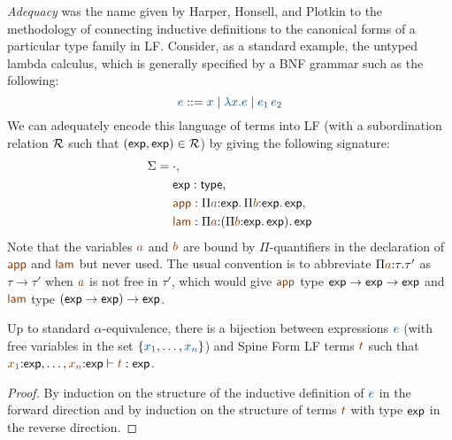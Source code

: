 {\it Adequacy} was the name given by Harper, Honsell, and Plotkin to
the methodology of connecting inductive definitions to the canonical
forms of a particular type family in LF. Consider, as a standard
example, the untyped lambda calculus, which is generally specified by
a BNF grammar such as the following:
\[
\obj{e} ::= \obj{x} \mid \obj{\lambda x.e} \mid \obj{e_1\,e_2}
\]
We can adequately encode this language of terms into LF (with a
subordination relation $\mathcal R$ such that $({\sf exp}, {\sf
  exp}) \in \mathcal R$) by giving the following signature:
\begin{align*}
\Sigma & = \cdot, 
\\
 & ~\quad {\sf exp} : {\sf type}, 
\\
 & ~\quad \lf{\sf app} : 
     \lfpi{a}{{\sf exp}}{\,\lfpi{b}{\sf exp}{\,\sf exp}},
\\
 & ~\quad \lf{\sf lam} : 
     \lfpi{a}{(\lfpi{b}{\sf exp}{\,\sf exp})}{\,\sf exp}
\end{align*}
Note that the variables $\lf{a}$ and $\lf{b}$ are bound by
$\Pi$-quantifiers in the declaration of $\lf{\sf app}$ and $\lf{\sf lam}$ but
never used. The usual convention is to abbreviate
$\lfpi{a}{\tau}{\tau'}$ as $\tau \rightarrow \tau'$ when $\lf{a}$ is
not free in $\tau'$, which would give $\lf{\sf app}$ type ${\sf exp}
\rightarrow {\sf exp} \rightarrow {\sf exp}$ and $\lf{\sf lam}$ type
$({\sf exp} \rightarrow {\sf exp}) \rightarrow {\sf exp}$.

\bigskip
\begin{theorem}\label{thm:expadequacy}
  Up to standard $\alpha$-equivalence, there is a bijection between
  expressions $\obj{e}$ (with free variables in the set
  $\{\obj{x_1},\ldots,\obj{x_n}\}$) and Spine Form LF terms $\lf{t}$ such
  that $\lf{x_1}{:}\mathsf{exp}, \ldots, \lf{x_n}{:}\mathsf{exp} \vdash
  \lf{t} : \mathsf{exp}$. 
\end{theorem}

\begin{proof}
By induction on the structure of the inductive definition of $\obj{e}$
in the forward direction and by induction on the structure of 
terms $\lf{t}$ with type ${\sf exp}$ in the reverse direction.
\end{proof}

